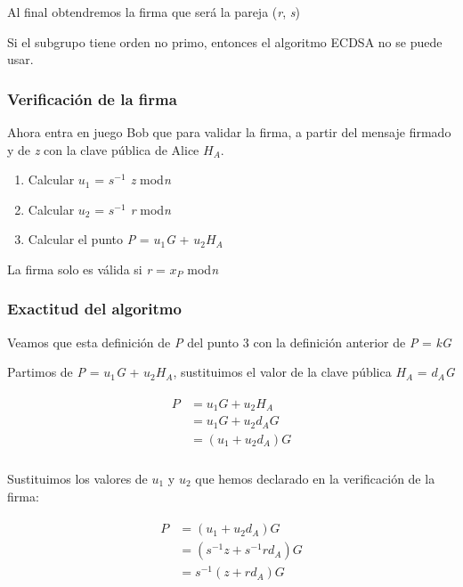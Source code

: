 \documentclass[11pt]{article}
\begin{document}
Al final obtendremos la firma que será la pareja (\textit{r}, \textit{s}) 


Si el subgrupo tiene orden no primo, entonces el algoritmo ECDSA no se puede usar.

\subsubsection*{Verificación de la firma}
Ahora entra en juego Bob que para validar la firma, a partir del mensaje firmado y de \textit{z} con la clave pública de Alice \textit{$H_A$}.

\begin{enumerate}
	\item Calcular \textit{$u_1$} = \textit{$s^{-1}$ z} mod\textit{n}
	\item Calcular \textit{$u_2$} = \textit{$s^{-1}$ r} mod\textit{n}
	\item Calcular el punto \textit{P} = \textit{$u_1$G} + \textit{$u_2$$H_A$}	
\end{enumerate}

La firma solo es válida si \textit{r} = \textit{$x_P$} mod\textit{n}


\subsubsection*{Exactitud del algoritmo}
Veamos que esta definición de \textit{P} del punto 3 con la definición anterior de \textit{P} = \textit{kG}

Partimos de \textit{P} = \textit{$u_1$G} + \textit{$u_2$$H_A$}, sustituimos el valor de la clave pública \textit{$H_A$} = \textit{$d_A$G}


\begin{align}
\begin{split}
\textit{P} &= \textit{$u_1$G} + \textit{$u_2$$H_A$}\\ &= \textit{$u_1$G} + \textit{$u_2$$d_A$G}\\
&= (\textit{$u_1$} + \textit{$u_2$$d_A$})\textit{G}\\
\end{split}
\end{align}

Sustituimos los valores de $u_1$ y $u_2$ que hemos declarado en la verificación de la firma:

\begin{align}
\begin{split}
P &= (\textit{$u_1$} + \textit{$u_2$$d_A$})\textit{G}\\
&= (\textit{$s^{-1}$z} + \textit{$s^{-1}$r$d_A$}) \textit{G}\\
&= \textit{$s^{-1}$}(\textit{z} + \textit{r$d_A$}) \textit{G}\\
\end{split}
\end{align}
\end{document}
